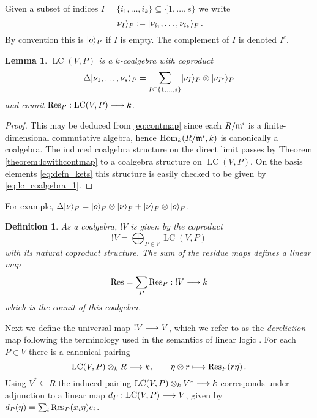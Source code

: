 \documentclass[english,letter paper,12pt,reqno]{article}
\DeclarePairedDelimiter\ket{\lvert}{\rangle}
\newtheorem{lemma}[theorem]{Lemma}
\theoremstyle{example}
\newtheorem{definition}[theorem]{Definition}
\numberwithin{equation}{section}
\def\Hom{\operatorname{Hom}}
\DeclareMathOperator{\LC}{LC}
\begin{document}
Given a subset of indices $I =  \{ i_1, \ldots, i_k \} \subseteq \{ 1, \ldots, s \}$ we write
\begin{equation}\label{eq:nu_I}
\ket{ \nu_I }_P := \ket{ \nu_{i_1}, \ldots, \nu_{i_k} }_P\,.
\end{equation}
By convention this is $\ket{o}_P$ if $I$ is empty. The complement of $I$ is denoted $I^c$.

\begin{lemma}\label{lemma:lc_coalgebra} $\LC(V,P)$ is a $k$-coalgebra with coproduct
\begin{equation}\label{eq:lc_coalgebra_1}
\Delta \ket{ \nu_1, \ldots, \nu_s }_P = \sum_{I \subseteq \{ 1, \ldots, s \}} \ket{ \nu_I }_P \otimes \ket{ \nu_{I^c} }_P
\end{equation}
and counit $\Res_P: \LC(V,P) \lto k$.
\end{lemma}
\begin{proof}
This may be deduced from \eqref{eq:contmap} since each $R/\mathfrak{m}^i$ is a finite-dimensional commutative algebra, hence $\Hom_k( R/\mf{m}^i, k )$ is canonically a coalgebra. The induced coalgebra structure on the direct limit passes by Theorem \ref{theorem:lcwithcontmap} to a coalgebra structure on $\LC(V,P)$. On the basis elements \eqref{eq:defn_kets} this structure is easily checked to be given by \eqref{eq:lc_coalgebra_1}.
\end{proof}

For example, $\Delta \ket{\nu}_P = \ket{o}_P \otimes \ket{\nu}_P + \ket{\nu}_P \otimes \ket{o}_P$.

\begin{definition}\label{definition:bang} As a coalgebra, $!V$ is given by the coproduct
\begin{equation}
!V = \bigoplus_{P \in V} \LC(V,P)
\end{equation}
with its natural coproduct structure. The sum of the residue maps defines a linear map
\begin{equation}\label{eq:residue_der}
\operatorname{Res}\!\, = \sum_P \operatorname{Res}\!_P: {!}V \longrightarrow k
\end{equation}
which is the counit of this coalgebra.
\end{definition}

Next we define the universal map ${!} V \longrightarrow V$, which we refer to as the \emph{dereliction} map following the terminology used in the semantics of linear logic \cite{mellies,murfet_ll}. For each $P \in V$ there is a canonical pairing
\[
\LC(V,P) \otimes_k R \lto k, \qquad \eta \otimes r \longmapsto \Res_P(r \eta)\,.
\]
Using $V^* \subseteq R$ the induced pairing $\LC(V,P) \otimes_k V^* \lto k$ corresponds under adjunction to a linear map $d_P: \LC(V,P) \lto V$, given by $d_P( \eta ) = \sum_i \operatorname{Res}\!_P( x_i \eta ) e_i$.
\end{document}
